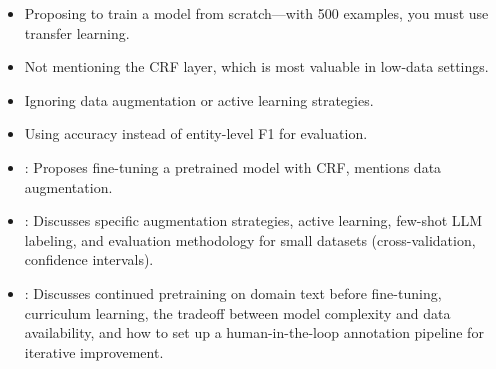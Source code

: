 \begin{interviewq}
\redflags
\begin{itemize}
    \item Proposing to train a model from scratch---with 500 examples, you
          must use transfer learning.
    \item Not mentioning the CRF layer, which is most valuable in low-data
          settings.
    \item Ignoring data augmentation or active learning strategies.
    \item Using accuracy instead of entity-level F1 for evaluation.
\end{itemize}


\goodgreat
\begin{itemize}
    \item {}: Proposes fine-tuning a pretrained model with CRF,
          mentions data augmentation.
    \item {}: Discusses specific augmentation strategies, active
          learning, few-shot LLM labeling, and evaluation methodology for
          small datasets (cross-validation, confidence intervals).
    \item {}: Discusses continued pretraining on domain text
          before fine-tuning, curriculum learning, the tradeoff between model
          complexity and data availability, and how to set up a human-in-the-loop
          annotation pipeline for iterative improvement.
\end{itemize}

\end{interviewq}
